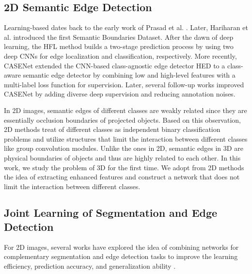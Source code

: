 \documentclass[runningheads]{llncs}
\begin{document}
\subsection{2D Semantic Edge Detection} \label{2D SED}


Learning-based {\SemEdgeD} dates back to the {early} work of Prasad et al. \cite{prasad2006learning}.
Later, Hariharan et al. \cite{hariharan2011semantic} introduced the first Semantic Boundaries Dataset. After the dawn of deep learning, {the HFL method}
\cite{Bertasius_2015} 
builds a two-stage prediction process by using two deep CNNs for edge localization and classification, respectively. 
More recently, CASENet \cite{yu2017casenet} extended the CNN-based class-agnostic edge detector HED \cite{xie2015holistically} to {a} class-aware semantic edge detector
{by combining} low\hb{-} and high-level features with a multi-label loss function for supervision. 
Later, several follow-up works \cite{liu2018semantic,yu2018simultaneous,acuna2019devil,hu2019panoptic} improved CASENet by adding diverse deep supervision and reducing annotation noises.


{In {2D images},
semantic edges of different classes are weakly related since they are {essentially} occlusion boundaries of projected objects. Based on this observation, 2D {\SemEdgeD} methods treat {\SemEdgeD} of different classes as independent binary classification problems and utilize structures that limit the interaction between different classes like group convolution {modules}. 
Unlike the ones in 2D, semantic edges in 3D are physical boundaries of objects and thus {are highly related to each other}.
In this work, we study the problem of 3D {\SemEdgeD} for the first time.
We {adopt from} 
2D methods the idea of extracting enhanced features 
and construct a network that {does not limit}
the interaction between different classes.}



\subsection{Joint Learning of Segmentation and Edge Detection}

For 2D images, several works have explored the idea of combining networks for complementary segmentation and edge detection tasks to improve the learning efficiency, prediction accuracy, and generalization ability \cite{cheng2017fusionnet,bertasius2016semantic,peng2017large,su2019selectivity,lin2017refinenet,wu2019stacked,takikawa2019gated}. 
\end{document}
